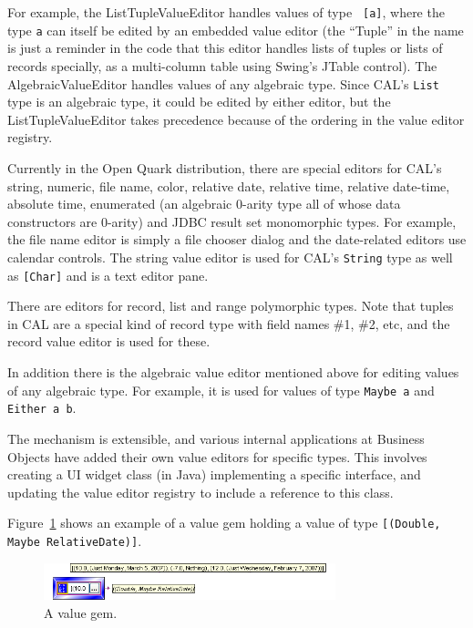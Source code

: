 \documentclass[preprint]{sigplanconf}
\begin{document}
For example, the ListTupleValueEditor handles values of type {\tt
[a]}, where the type {\tt a} can itself be edited by an embedded value
editor (the ``Tuple'' in the name is just a reminder in the code that
this editor handles lists of tuples or lists of records specially, as
a multi-column table using Swing's JTable control). 
The AlgebraicValueEditor handles values of any algebraic type.
Since CAL's {\tt List} type is an algebraic type, it
could be edited by either editor, but the ListTupleValueEditor takes
precedence because of the ordering in the value editor registry.

Currently in the Open Quark distribution, there are special
editors for CAL's string, numeric, file name, color,
relative date, relative time, relative date-time, absolute time,
enumerated (an algebraic 0-arity type all of whose data
constructors are 0-arity) and JDBC result set monomorphic types. For example, the
file name editor is simply a file chooser dialog and the date-related editors use
calendar controls. The string value editor is used for CAL's {\tt String} type as well
as {\tt [Char]} and is a text editor pane.

There are editors for record, list and range polymorphic types. Note
that tuples in CAL are a special kind of record type with field names
\#1, \#2, etc, and the record value editor is used for these. 

In addition there is the algebraic value editor mentioned above for editing
values of any algebraic type. For example, it is used for values of type
{\tt Maybe a} and {\tt Either a b}.

The mechanism is extensible, and various internal applications at
Business Objects have added their own value editors for specific
types. This involves creating a UI widget class (in Java)
implementing a specific interface, and updating the value editor
registry to include a reference to this class.

Figure~\ref{fig:valueEntry-a} shows an example of a value gem holding a
value of type {\tt [(Double, Maybe RelativeDate)]}.

\begin{figure}[htb]
  \centering
  \includegraphics[width=20pc]{valueEntry-a.png}
  \caption{A value gem.}
  \label{fig:valueEntry-a}
\end{figure}
\end{document}
